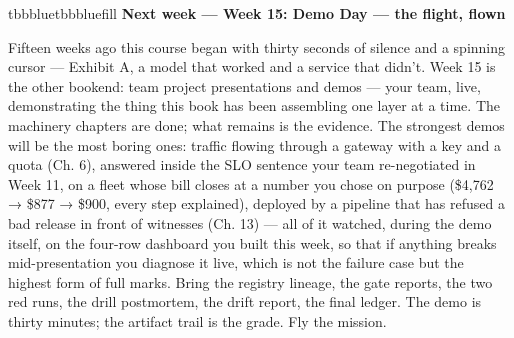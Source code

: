 \vspace{5.0pt}

\begin{calloutbox}{tbbblue}{tbbbluefill}
{\normalsize\bfseries\color{tbbblue}Next week — Week 15: Demo Day — the flight, flown}\par\vspace{3pt}
Fifteen weeks ago this course began with thirty seconds of silence and a spinning cursor — Exhibit A, a model that worked and a service that didn’t. Week 15 is the other bookend: team project presentations and demos — your team, live, demonstrating the thing this book has been assembling one layer at a time. The machinery chapters are done; what remains is the evidence. The strongest demos will be the most boring ones: traffic flowing through a gateway with a key and a quota (Ch. 6), answered inside the SLO sentence your team re-negotiated in Week 11, on a fleet whose bill closes at a number you chose on purpose (\$4,762 → \$877 → \$900, every step explained), deployed by a pipeline that has refused a bad release in front of witnesses (Ch. 13) — all of it watched, during the demo itself, on the four-row dashboard you built this week, so that if anything breaks mid-presentation you diagnose it live, which is not the failure case but the highest form of full marks. Bring the registry lineage, the gate reports, the two red runs, the drill postmortem, the drift report, the final ledger. The demo is thirty minutes; the artifact trail is the grade. Fly the mission.
\end{calloutbox}

